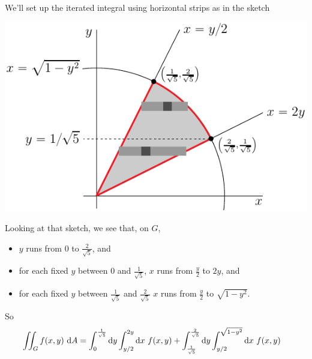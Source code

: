 \begin{solution}
We'll set up the iterated integral using horizontal strips as in the
sketch
\begin{center}
     \includegraphics{fig/OE10A_5xy.pdf}
\end{center}

Looking at that sketch, we see that, on $G$,
\begin{itemize}
\item
$y$ runs from $0$ to $\frac{2}{\sqrt{5}}$, and
\item
for each fixed $y$ between $0$ and $\frac{1}{\sqrt{5}}$,
$x$ runs from $\frac{y}{2}$ to $2y$, and
\item
for each fixed $y$ between $\frac{1}{\sqrt{5}}$ and $\frac{2}{\sqrt{5}}$
$x$ runs from $\frac{y}{2}$ to $\sqrt{1-y^2}$.
\end{itemize}
So
\begin{align*}
\iint_G f(x,y)\ \mathrm{d}A
&=\int_0^{\frac{1}{\sqrt{5}}}\mathrm{d}y\int_{y/2}^{2y}\mathrm{d}x\ f(x,y)
 +\int_{\frac{1}{\sqrt{5}}}^{\frac{2}{\sqrt{5}}}\mathrm{d}y\int_{y/2}^{\sqrt{1-y^2}}
         \mathrm{d}x\ f(x,y)
\end{align*}


\end{solution}
